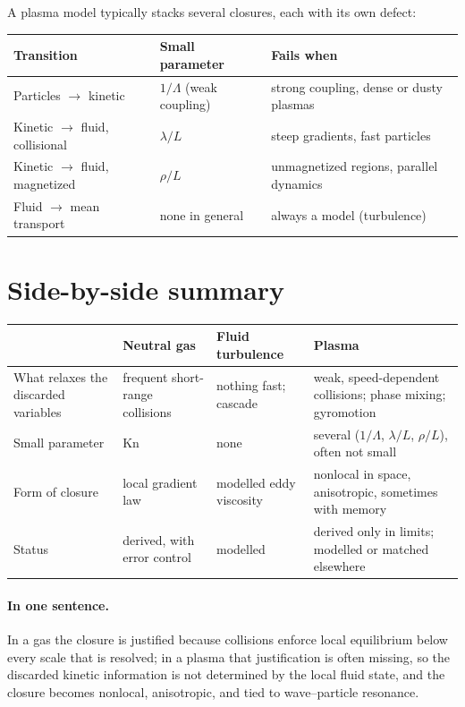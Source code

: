 \documentclass[11pt]{article}
\newcommand{\Kn}{\mathrm{Kn}}
\begin{document}
A plasma model typically stacks several closures, each with its own defect:
\begin{center}
\renewcommand{\arraystretch}{1.4}
\begin{tabular}{>{\raggedright}p{4.2cm}>{\raggedright}p{4.6cm}p{5.2cm}}
  Transition & Small parameter & Fails when \\ \hline
  Particles $\to$ kinetic & $1/\Lambda$ (weak coupling)
     & strong coupling, dense or dusty plasmas \\
  Kinetic $\to$ fluid, collisional & $\lambda/L$
     & steep gradients, fast particles \\
  Kinetic $\to$ fluid, magnetized & $\rho/L$
     & unmagnetized regions, parallel dynamics \\
  Fluid $\to$ mean transport & none in general
     & always a model (turbulence) \\
\end{tabular}
\end{center}

\section{Side-by-side summary}

\begin{center}
\renewcommand{\arraystretch}{1.5}
\begin{tabular}{>{\raggedright}p{2.9cm}>{\raggedright}p{3.4cm}>{\raggedright}p{3.4cm}p{4.3cm}}
  & Neutral gas & Fluid turbulence & Plasma \\ \hline
  What relaxes the discarded variables
    & frequent short-range collisions
    & nothing fast; cascade
    & weak, speed-dependent collisions; phase mixing; gyromotion \\
  Small parameter
    & $\Kn$
    & none
    & several ($1/\Lambda$, $\lambda/L$, $\rho/L$), often not small \\
  Form of closure
    & local gradient law
    & modelled eddy viscosity
    & nonlocal in space, anisotropic, sometimes with memory \\
  Status
    & derived, with error control
    & modelled
    & derived only in limits; modelled or matched elsewhere \\
\end{tabular}
\end{center}

\paragraph{In one sentence.} In a gas the closure is justified because
collisions enforce local equilibrium below every scale that is resolved; in a
plasma that justification is often missing, so the discarded kinetic
information is not determined by the local fluid state, and the closure
becomes nonlocal, anisotropic, and tied to wave--particle resonance.
\end{document}
